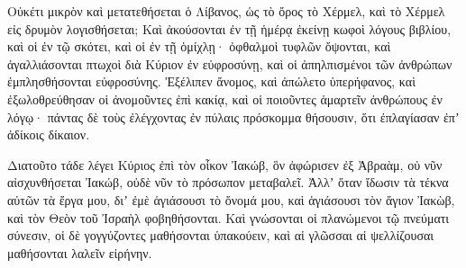 {Οὐκέτι μικρὸν καὶ μετατεθήσεται ὁ Λίβανος, ὡς τὸ ὄρος τὸ Χέρμελ, καὶ τὸ Χέρμελ εἰς δρυμὸν λογισθήσεται;
Καὶ ἀκούσονται ἐν τῇ ἡμέρᾳ ἐκείνῃ κωφοὶ λόγους βιβλίου, καὶ οἱ ἐν τῷ σκότει, καὶ οἱ ἐν τῇ ὁμίχλῃ· ὀφθαλμοὶ τυφλῶν ὄψονται,
καὶ ἀγαλλιάσονται πτωχοὶ διὰ Κύριον ἐν εὐφροσύνῃ, καὶ οἱ ἀπηλπισμένοι τῶν ἀνθρώπων ἐμπλησθήσονται εὐφροσύνης.
Ἐξέλιπεν ἄνομος, καὶ ἀπώλετο ὑπερήφανος, καὶ ἐξωλοθρεύθησαν οἱ ἀνομοῦντες ἐπὶ κακίᾳ,
καὶ οἱ ποιοῦντες ἁμαρτεῖν ἀνθρώπους ἐν λόγῳ· πάντας δὲ τοὺς ἐλέγχοντας ἐν πύλαις πρόσκομμα θήσουσιν, ὅτι ἐπλαγίασαν ἐπʼ ἀδίκοις δίκαιον.
\par }{\PP {}Διατοῦτο τάδε λέγει Κύριος ἐπὶ τὸν οἶκον Ἰακώβ, ὃν ἀφώρισεν ἐξ Ἀβραὰμ, οὐ νῦν αἰσχυνθήσεται Ἰακώβ, οὐδὲ νῦν τὸ πρόσωπον μεταβαλεῖ.
Ἀλλʼ ὅταν ἴδωσιν τὰ τέκνα αὐτῶν τὰ ἔργα μου, διʼ ἐμὲ ἁγιάσουσι τὸ ὄνομά μου, καὶ ἁγιάσουσι τὸν ἅγιον Ἰακὼβ, καὶ τὸν Θεὸν τοῦ Ἰσραὴλ φοβηθήσονται.
Καὶ γνώσονται οἱ πλανώμενοι τῷ πνεύματι σύνεσιν, οἱ δὲ γογγύζοντες μαθήσονται ὑπακούειν, καὶ αἱ γλῶσσαι αἱ ψελλίζουσαι μαθήσονται λαλεῖν εἰρήνην.

}
